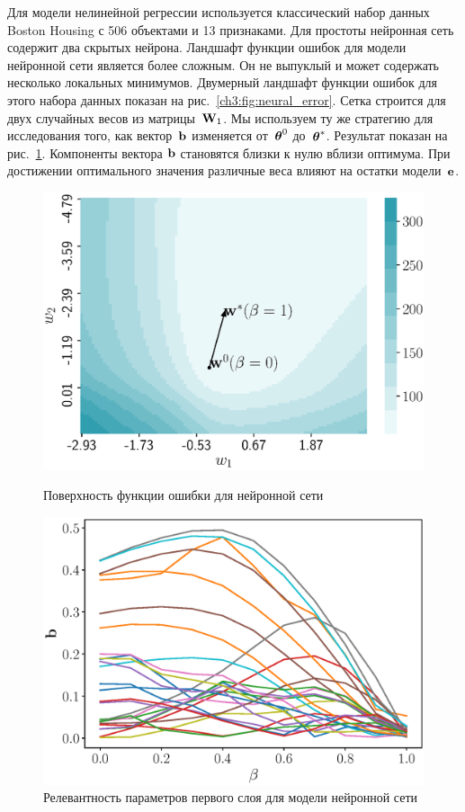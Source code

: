 Для модели нелинейной регрессии используется классический набор данных Boston Housing с 506 объектами и 13 признаками.
Для простоты нейронная сеть содержит два скрытых нейрона.
Ландшафт функции ошибок для модели нейронной сети является более сложным. 
Он не выпуклый и может содержать несколько локальных минимумов.
Двумерный ландшафт функции ошибок для этого набора данных показан на рис.~\ref{ch3:fig:neural_error}. 
Сетка строится для двух случайных весов из матрицы~$\mathbf{W}_1$.
Мы используем ту же стратегию для исследования того, как вектор~$\mathbf{b}$ изменяется от~$\boldsymbol{\theta}^0$ до~$\boldsymbol{\theta}^*$. 
Результат показан на рис.~\ref{ch3:fig:neural_b_wrt_beta}.
Компоненты вектора $\mathbf{b}$ становятся близки к нулю вблизи оптимума. 
При достижении оптимального значения различные веса влияют на остатки модели~$\mathbf{e}$.
\begin{figure}
	\centering
	\begin{minipage}{.5\textwidth}
		\centering
		\includegraphics[width=\linewidth]{figs/ch3/neural_error}
		\caption{Поверхность функции ошибки для нейронной сети}
		\label{ch3:fig:neural_error}
	\end{minipage}%
	\begin{minipage}{.5\textwidth}
		\centering
		\includegraphics[width=\linewidth]{figs/ch3/neural_b_wrt_beta}
		\caption{Релевантность параметров первого слоя для модели нейронной сети}
		\label{ch3:fig:neural_b_wrt_beta}
	\end{minipage}
\end{figure}

